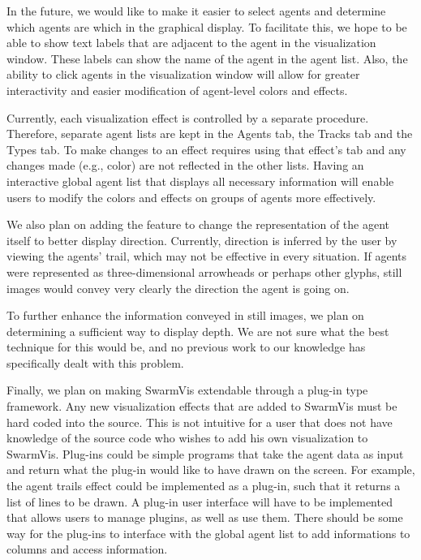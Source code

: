\documentclass[conference]{IEEEtran}
\begin{document}
In the future, we would like to make it easier to select agents and determine which agents are which in the graphical display.
To facilitate this, we hope to be able to show text labels that are adjacent to the agent in the visualization window.
These labels can show the name of the agent in the agent list.
Also, the ability to click agents in the visualization window will allow for greater interactivity and easier modification of agent-level colors and effects.

Currently, each visualization effect is controlled by a separate procedure.
Therefore, separate agent lists are kept in the Agents tab, the Tracks tab and the Types tab.
To make changes to an effect requires using that effect's tab and any changes made (e.g., color) are not reflected in the other lists.
Having an interactive global agent list that displays all necessary information will enable users to modify
the colors and effects on groups of agents more effectively. 

We also plan on adding the feature to change the representation of the agent itself to better display direction. Currently, direction is
inferred by the user by viewing the agents' trail, which may not be effective in every situation.
If agents were represented as three-dimensional arrowheads or perhaps other glyphs,
still images would convey very clearly the direction the agent is going on.

To further enhance the information conveyed in still images, we plan on determining a sufficient way to display depth.
We are not sure what the best technique for this would be, and no previous work to our knowledge has specifically dealt with this problem.

Finally, we plan on making SwarmVis extendable through a plug-in type framework. Any new visualization effects that are added
to SwarmVis must be hard coded into the source. This is not intuitive for a user that does not have knowledge of the source code
who wishes to add his own visualization to SwarmVis. Plug-ins could be simple programs that take the agent data as input and return
what the plug-in would like to have drawn on the screen. For example, the agent trails effect could be implemented as a plug-in, such
that it returns a list of lines to be drawn. A plug-in user interface will have to be implemented that allows users to manage plugins,
as well as use them. There should be some way for the plug-ins to interface with the global agent list to add informations to columns
and access information.
\end{document}
